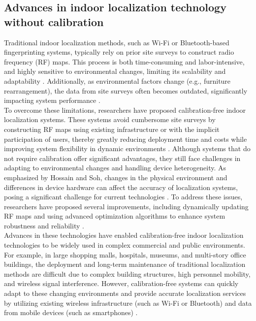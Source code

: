 \documentclass[12pt,a4paper]{article}
\numberwithin{equation}{section}
\begin{document}
\subsection{Advances in indoor localization technology without calibration}
Traditional indoor localization methods, such as Wi-Fi or Bluetooth-based fingerprinting systems, typically rely on prior site surveys to construct radio frequency (RF) maps. This process is both time-consuming and labor-intensive, and highly sensitive to environmental changes, limiting its scalability and adaptability \cite{liu2020survey}. Additionally, as environmental factors change (e.g., furniture rearrangement), the data from site surveys often becomes outdated, significantly impacting system performance \cite{jiang2019indoor}.\\
To overcome these limitations, researchers have proposed calibration-free indoor localization systems. These systems avoid cumbersome site surveys by constructing RF maps using existing infrastructure or with the implicit participation of users, thereby greatly reducing deployment time and costs while improving system flexibility in dynamic environments \cite{HOSSAIN20151,li2018calibrationfree}.
Although systems that do not require calibration offer significant advantages, they still face challenges in adapting to environmental changes and handling device heterogeneity. As emphasized by Hossain and Soh, changes in the physical environment and differences in device hardware can affect the accuracy of localization systems, posing a significant challenge for current technologies \cite{HOSSAIN20151}. To address these issues, researchers have proposed several improvements, including dynamically updating RF maps and using advanced optimization algorithms to enhance system robustness and reliability \cite{zhang2020robust}.\\
Advances in these technologies have enabled calibration-free indoor localization technologies to be widely used in complex commercial and public environments. For example, in large shopping malls, hospitals, museums, and multi-story office buildings, the deployment and long-term maintenance of traditional localization methods are difficult due to complex building structures, high personnel mobility, and wireless signal interference. However, calibration-free systems can quickly adapt to these changing environments and provide accurate localization services by utilizing existing wireless infrastructure (such as Wi-Fi or Bluetooth) and data from mobile devices (such as smartphones) \cite{laoudias2018survey,xu2019wireless}.\\
\end{document}
